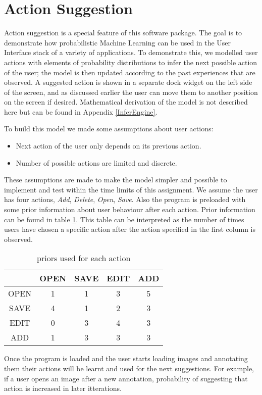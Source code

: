 \section{Action Suggestion}
Action suggestion is a special feature of this software package. The goal is to demonstrate how probabilistic Machine Learning can be used in the User Interface stack of a variety of applications. To demonstrate this, we modelled user actions with elements of probability distributions to infer the next possible action of the user; the model is then updated according to the past experiences that are observed. A suggested action is shown in a separate dock widget on the left side of the screen, and as discussed earlier the user can move them to another position on the screen if desired. Mathematical derivation of the model is not described here but can be found in Appendix \ref{InferEngine}. 

To build this model we made some assumptions about user actions:
\begin{itemize}
\item Next action of the user only depends on its previous action.
\item Number of possible actions are limited and discrete.
\end{itemize}
These assumptions are made to make the model simpler and possible to implement and test within the time limits of this assignment. We assume the user has four actions, {\textit{Add}, \textit{Delete}, \textit{Open}, \textit{Save}}. Also the program is preloaded with some prior information about user behaviour after each action. Prior information can be found in table \ref{tab:priors}. This table can be interpreted as the number of times users have chosen a specific action after the action specified in the first column is observed.
\begin{table}[t]
\centering
\begin{tabular}{|c|c|c|c|c|}
\hline \rule[-1ex]{0pt}{3.5ex}  & OPEN & SAVE & EDIT & ADD \\ 
\hline \rule[-1ex]{0pt}{3.5ex} OPEN & 1 & 1 & 3 & 5 \\ 
\hline \rule[-1ex]{0pt}{3.5ex} SAVE & 4 & 1 & 2 & 3 \\ 
\hline \rule[-1ex]{0pt}{3.5ex} EDIT & 0 & 3 & 4 & 3 \\ 
\hline \rule[-1ex]{0pt}{3.5ex} ADD & 1 & 3 & 3 & 3 \\ 
\hline 
\end{tabular}
\caption{priors used for each action}
\label{tab:priors}
\end{table}
Once the program is loaded and the user starts loading images and annotating them their actions will be learnt and used for the next suggestions. For example, if a user opens an image after a new annotation, probability of suggesting that action is increased in later itterations.

